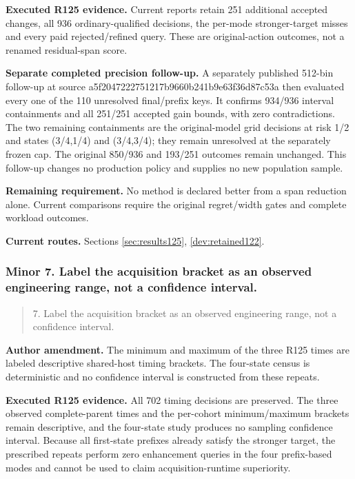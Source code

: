 \noindent\textbf{Executed R125 evidence.} Current reports retain 251 additional accepted changes, all 936 ordinary-qualified decisions, the per-mode stronger-target misses and every paid rejected/refined query. These are original-action outcomes, not a renamed residual-span score.

\noindent\textbf{Separate completed precision follow-up.} A separately published 512-bin follow-up at source a5f2047222751217b9660b241b9e63f36d87c53a then evaluated every one of the 110 unresolved final/prefix keys. It confirms 934/936 interval containments and all 251/251 accepted gain bounds, with zero contradictions. The two remaining containments are the original-model grid decisions at risk 1/2 and states (3/4,1/4) and (3/4,3/4); they remain unresolved at the separately frozen cap. The original 850/936 and 193/251 outcomes remain unchanged. This follow-up changes no production policy and supplies no new population sample.

\noindent\textbf{Remaining requirement.} No method is declared better from a span reduction alone. Current comparisons require the original regret/width gates and complete workload outcomes.

\noindent\textbf{Current routes.} Sections \ref{sec:results125}, \ref{dev:retained122}.

\subsubsection{Minor 7. Label the acquisition bracket as an observed engineering range, not a confidence interval.}

\begin{quote}\small
7. Label the acquisition bracket as an observed engineering range, not a confidence interval.
\end{quote}

\noindent\textbf{Author amendment.} The minimum and maximum of the three R125 times are labeled descriptive shared-host timing brackets. The four-state census is deterministic and no confidence interval is constructed from these repeats.

\noindent\textbf{Executed R125 evidence.} All 702 timing decisions are preserved. The three observed complete-parent times and the per-cohort minimum/maximum brackets remain descriptive, and the four-state study produces no sampling confidence interval. Because all first-state prefixes already satisfy the stronger target, the prescribed repeats perform zero enhancement queries in the four prefix-based modes and cannot be used to claim acquisition-runtime superiority.


